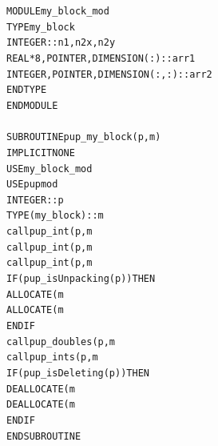 \documentclass[11pt]{article}
\begin{document}
\begin{alltt}
     MODULE my\_block\_mod\\
       TYPE my\_block\\
         INTEGER :: n1,n2x,n2y\\
         REAL*8, POINTER, DIMENSION(:) :: arr1\\
         INTEGER, POINTER, DIMENSION(:,:) :: arr2\\
       END TYPE\\
     END MODULE\\
 \\
     SUBROUTINE pup\_my\_block(p,m)\\
       IMPLICIT NONE\\
       USE my\_block\_mod\\
       USE pupmod\\
       INTEGER :: p\\
       TYPE(my\_block) :: m\\
       call pup\_int(p,m%
       call pup\_int(p,m%
       call pup\_int(p,m%
       IF (pup\_isUnpacking(p)) THEN\\
         ALLOCATE(m%
         ALLOCATE(m%
       END IF\\
       call pup\_doubles(p,m%
       call pup\_ints(p,m%
       IF (pup\_isDeleting(p)) THEN\\
         DEALLOCATE(m%
         DEALLOCATE(m%
       END IF\\
     END SUBROUTINE\\
\end{alltt}
\end{document}
